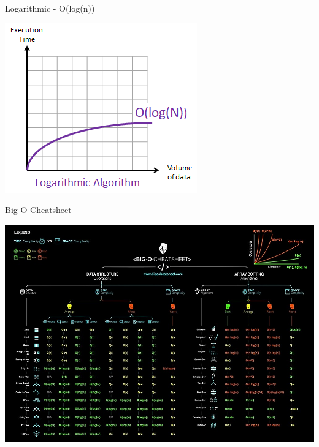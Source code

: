 \begin{frame}{Logarithmic - O(log(n))}
	\begin{center}
		\includegraphics[height=0.8\textheight]{LogComplexity}
	\end{center}
\end{frame}

\begin{frame}{Big O Cheatsheet}
	\begin{center}
	\includegraphics[height=0.8\textheight]{BigOCheatSheet}
	\end{center}
\end{frame}